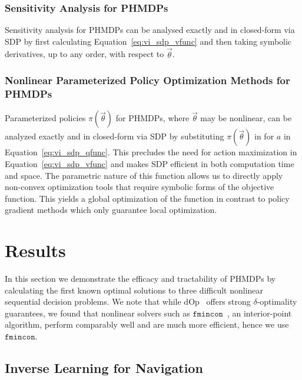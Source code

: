 \documentclass[letterpaper]{article}
\begin{document}
\subsubsection{Sensitivity Analysis for PHMDPs}

Sensitivity analysis for PHMDPs can be analysed exactly and in closed-form via SDP by first calculating Equation~\eqref{eq:vi_sdp_vfunc} and then taking symbolic derivatives, up to any order, with respect to %
{\footnotesize $\vec{\theta}$}.

\subsubsection{Nonlinear Parameterized Policy Optimization Methods for PHMDPs}

Parameterized policies {\footnotesize $ \pi(\vec{\theta}) $} for PHMDPs, where {\footnotesize $\vec{\theta}$} may be nonlinear, can be analyzed exactly and in closed-form via SDP by substituting {\footnotesize $ \pi(\vec{\theta}) $} in for {\footnotesize  $ a $} in Equation~\eqref{eq:vi_sdp_qfunc}. This precludes the need for action maximization in Equation~\eqref{eq:vi_sdp_vfunc} and makes SDP efficient in both computation time and space. The parametric nature of this function allows us to directly apply non-convex optimization tools that require symbolic forms of the objective function. This yields a global optimization of the function in contrast to policy gradient methods which only guarantee local optimization.

\section{Results}
\label{sec:results}

In this section we demonstrate the efficacy and tractability of PHMDPs by calculating the first known optimal solutions to three difficult nonlinear sequential decision problems. We note that while dOp~\cite{Gao2013} offers strong {\footnotesize $ \delta $}-optimality guarantees, we found that nonlinear solvers such as $ \mathtt{fmincon} $~\cite{MATLAB_2010}, an interior-point algorithm, perform comparably well and are much more efficient, hence we use $ \mathtt{fmincon} $.

\subsection{Inverse Learning for Navigation}
\label{sec:results_navigation}
\end{document}
